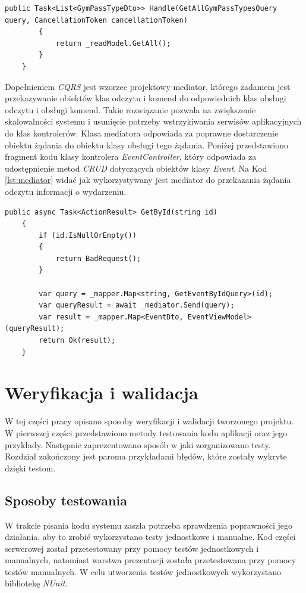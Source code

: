 \documentclass[a4paper,twoside,12pt]{book}
\begin{document}
{\begin{lstlisting}[caption={Klasa \textit{GymPassTypesQueryHandler}}, label={lst:queryHangler}]
		public Task<List<GymPassTypeDto>> Handle(GetAllGymPassTypesQuery query, CancellationToken cancellationToken)
		{
			return _readModel.GetAll();
		}
	}
\end{lstlisting}
Dopełnieniem \textit{CQRS} jest wzorzec projektowy mediator, którego zadaniem jest przekazywanie obiektów klas odczytu i komend do odpowiednich klas obsługi odczytu i obsługi komend. Takie rozwiązanie pozwala na zwiększenie skalowalności systemu i usunięcie potrzeby wstrzykiwania serwisów aplikacyjnych do klas kontrolerów. Klasa mediatora odpowiada za poprawne dostarczenie obiektu żądania do obiektu klasy obsługi tego żądania. Poniżej przedstawiono fragment kodu klasy kontrolera \textit{EventController}, który odpowiada za udostępnienie metod \textit{CRUD} dotyczących obiektów klasy \textit{Event}. Na Kod \ref{lst:mediator} widać jak wykorzystywany jest mediator do przekazania żądania odczytu informacji o wydarzeniu.
\begin{lstlisting}[caption={Metoda \textit{GetById} klasy \textit{EventController}}, label={lst:mediator}]
	public async Task<ActionResult> GetById(string id)
	{
		if (id.IsNullOrEmpty())
		{
			return BadRequest();
		}
		
		var query = _mapper.Map<string, GetEventByIdQuery>(id);
		var queryResult = await _mediator.Send(query);
		var result = _mapper.Map<EventDto, EventViewModel>(queryResult);
		return Ok(result);
	}
\end{lstlisting}

\chapter{Weryfikacja i walidacja}
\label{chap:validation}
W tej części pracy opisano sposoby weryfikacji i walidacji tworzonego projektu. W pierwszej części przedstawiono metody testowania kodu aplikacji oraz jego przykłady. Następnie zaprezentowano sposób w jaki zorganizowano testy. Rozdział zakończony jest paroma przykładami błędów, które zostały wykryte dzięki testom.

\section{Sposoby testowania}
W trakcie pisania kodu systemu zaszła potrzeba sprawdzenia poprawności jego działania, aby to zrobić wykorzystano testy jednostkowe i manualne. Kod części serwerowej został przetestowany przy pomocy testów jednostkowych i manualnych, natomiast warstwa prezentacji została przetestowana przy pomocy testów manualnych. W celu utworzenia testów jednostkowych wykorzystano bibliotekę \textit{NUnit}.

}
\end{document}
